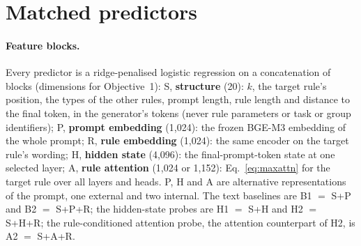 \documentclass{article}
\newcommand{\blk}[1]{\textsf{#1}}
\begin{document}
\section{Matched predictors}
\label{sec:methods}

\paragraph{Feature blocks.} Every predictor is a ridge-penalised logistic regression on a concatenation of blocks
(dimensions for Objective~1): \blk{S}, \textbf{structure} (20): $k$, the target rule's position, the types of the other
rules, prompt length, rule length and distance to the final token, in the generator's tokens (never rule parameters or
task or group identifiers); \blk{P}, \textbf{prompt embedding} (1,024): the frozen BGE-M3 embedding \citep{chen2024bge}
of the whole prompt; \blk{R}, \textbf{rule embedding} (1,024): the same encoder on the target rule's wording;
\blk{H}, \textbf{hidden state} (4,096): the final-prompt-token state at one selected layer; \blk{A}, \textbf{rule
attention} (1,024 or 1,152): Eq.~\eqref{eq:maxattn} for the target rule over all layers and heads. \blk{P}, \blk{H}
and \blk{A} are alternative representations of the prompt, one external and two internal. The text baselines are
B1 $=$ \blk{S}+\blk{P} and B2 $=$ \blk{S}+\blk{P}+\blk{R}; the hidden-state probes are H1 $=$ \blk{S}+\blk{H} and
H2 $=$ \blk{S}+\blk{H}+\blk{R}; the rule-conditioned attention probe, the attention counterpart of H2, is A2 $=$ \blk{S}+\blk{A}+\blk{R}.
\end{document}
